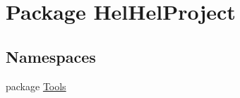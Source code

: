 \hypertarget{namespace_hel_hel_project}{}\section{Package Hel\+Hel\+Project}
\label{namespace_hel_hel_project}
\subsection*{Namespaces}
\begin{DoxyCompactItemize}
\item 
package \hyperlink{namespace_hel_hel_project_1_1_tools}{Tools}
\end{DoxyCompactItemize}
